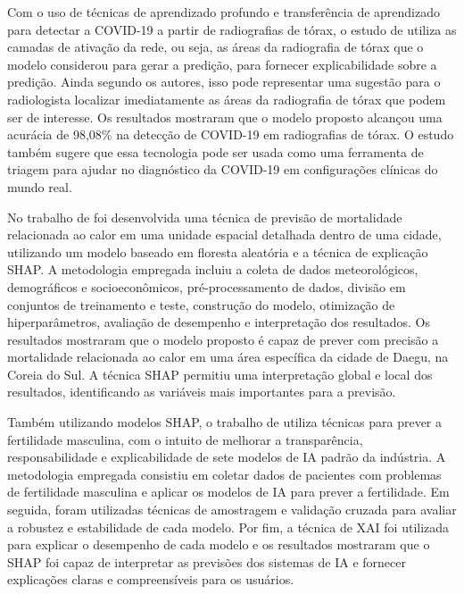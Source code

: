 Com o uso de técnicas de aprendizado profundo e transferência de aprendizado para detectar a COVID-19 a partir de radiografias de tórax, o estudo de  utiliza as camadas de ativação da rede, ou seja, as áreas da radiografia de tórax que o modelo considerou para gerar a predição, para fornecer explicabilidade sobre a predição. Ainda segundo os autores, isso pode representar uma sugestão para o radiologista localizar imediatamente as áreas da radiografia de tórax que podem ser de interesse. Os resultados mostraram que o modelo proposto alcançou uma acurácia de 98,08\% na detecção de COVID-19 em radiografias de tórax. O estudo também sugere que essa tecnologia pode ser usada como uma ferramenta de triagem para ajudar no diagnóstico da COVID-19 em configurações clínicas do mundo real.

No trabalho de  foi desenvolvida uma técnica de previsão de mortalidade relacionada ao calor em uma unidade espacial detalhada dentro de uma cidade, utilizando um modelo baseado em floresta aleatória e a técnica de explicação SHAP. A metodologia empregada incluiu a coleta de dados meteorológicos, demográficos e socioeconômicos, pré-processamento de dados, divisão em conjuntos de treinamento e teste, construção do modelo, otimização de hiperparâmetros, avaliação de desempenho e interpretação dos resultados. Os resultados mostraram que o modelo proposto é capaz de prever com precisão a mortalidade relacionada ao calor em uma área específica da cidade de Daegu, na Coreia do Sul. A técnica SHAP permitiu uma interpretação global e local dos resultados, identificando as variáveis mais importantes para a previsão.

Também utilizando modelos SHAP, o trabalho de  utiliza técnicas para prever a fertilidade masculina, com o intuito de melhorar a transparência, responsabilidade e explicabilidade de sete modelos de IA padrão da indústria. A metodologia empregada consistiu em coletar dados de pacientes com problemas de fertilidade masculina e aplicar os modelos de IA para prever a fertilidade. Em seguida, foram utilizadas técnicas de amostragem e validação cruzada para avaliar a robustez e estabilidade de cada modelo. Por fim, a técnica de XAI foi utilizada para explicar o desempenho de cada modelo e os resultados mostraram que o SHAP foi capaz de interpretar as previsões dos sistemas de IA e fornecer explicações claras e compreensíveis para os usuários.